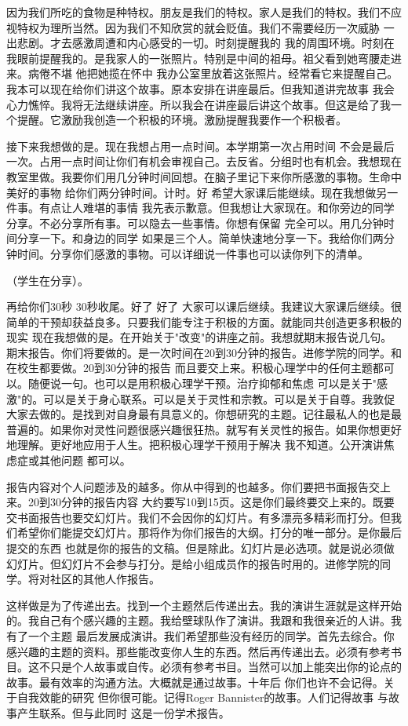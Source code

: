 因为我们所吃的食物是种特权。朋友是我们的特权。家人是我们的特权。我们不应视特权为理所当然。因为我们不知欣赏的就会贬值。我们不需要经历一次威胁 一出悲剧。才去感激周遭和内心感受的一切。时刻提醒我的 我的周围环境。时刻在我眼前提醒我的。是我家人的一张照片。特别是中间的祖母。祖父看到她弯腰走进来。病倦不堪 他把她揽在怀中 我办公室里放着这张照片。经常看它来提醒自己。我本可以现在给你们讲这个故事。原本安排在讲座最后。但我知道讲完故事 我会心力憔悴。我将无法继续讲座。所以我会在讲座最后讲这个故事。但这是给了我一个提醒。它激励我创造一个积极的环境。激励提醒我要作一个积极者。 

接下来我想做的是。现在我想占用一点时间。本学期第一次占用时间 不会是最后一次。占用一点时间让你们有机会审视自己。去反省。分组时也有机会。我想现在教室里做。我要你们用几分钟时间回想。在脑子里记下来你所感激的事物。生命中美好的事物 给你们两分钟时间。计时。好 希望大家课后能继续。现在我想做另一件事。有点让人难堪的事情 我先表示歉意。但我想让大家现在。和你旁边的同学分享。不必分享所有事。可以隐去一些事情。你想有保留 完全可以。用几分钟时间分享一下。和身边的同学 如果是三个人。简单快速地分享一下。我给你们两分钟时间。分享你们感激的事物。可以详细说一件事也可以读你列下的清单。 

（学生在分享）。 

再给你们30秒 30秒收尾。好了 好了 大家可以课后继续。我建议大家课后继续。很简单的干预却获益良多。只要我们能专注于积极的方面。就能同共创造更多积极的现实 现在我想做的是。在开始关于"改变"的讲座之前。我想就期末报告说几句。期末报告。你们将要做的。是一次时间在20到30分钟的报告。进修学院的同学。和在校生都要做。20到30分钟的报告 而且要交上来。积极心理学中的任何主题都可以。随便说一句。也可以是用积极心理学干预。治疗抑郁和焦虑 可以是关于"感激"的。可以是关于身心联系。可以是关于灵性和宗教。可以是关于自尊。我敦促大家去做的。是找到对自身最有具意义的。你想研究的主题。记往最私人的也是最普遍的。如果你对灵性问题很感兴趣很狂热。就写有关灵性的报告。如果你想更好地理解。更好地应用于人生。把积极心理学干预用于解决 我不知道。公开演讲焦虑症或其他问题 都可以。 

报告内容对个人问题涉及的越多。你从中得到的也越多。你们要把书面报告交上来。20到30分钟的报告内容 大约要写10到15页。这是你们最终要交上来的。既要交书面报告也要交幻灯片。我们不会因你的幻灯片。有多漂亮多精彩而打分。但我们希望你们能提交幻灯片。那将作为你们报告的大纲。打分的唯一部分。是你最后提交的东西 也就是你的报告的文稿。但是除此。幻灯片是必选项。就是说必须做幻灯片。但幻灯片不会参与打分。是给小组成员作的报告时用的。进修学院的同学。将对社区的其他人作报告。 

这样做是为了传递出去。找到一个主题然后传递出去。我的演讲生涯就是这样开始的。我自己有个感兴趣的主题。我给壁球队作了演讲。我跟和我很亲近的人讲。我有了一个主题 最后发展成演讲。我们希望那些没有经历的同学。首先去综合。你感兴趣的主题的资料。那些能改变你人生的东西。然后再传递出去。必须有参考书目。这不只是个人故事或自传。必须有参考书目。当然可以加上能突出你的论点的故事。最有效率的沟通方法。大概就是通过故事。十年后 你们也许不会记得。关于自我效能的研究 但你很可能。记得Roger Bannister的故事。人们记得故事 与故事产生联系。但与此同时 这是一份学术报告。 

